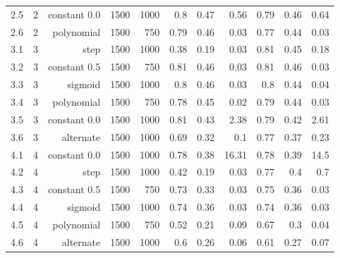 \begin{table}[]
{\begin{tabular}{rrrrrrrrrrr}
      2.5                  & 2                    & constant 0.0         & 1500           & 1000    & 0.8   & 0.47 & 0.56  & 0.79 & 0.46 & 0.64  \\
      2.6                  & 2                    & polynomial           & 1500           & 750     & 0.79  & 0.46 & 0.03  & 0.77 & 0.44 & 0.03  \\
      \hline
      3.1                  & 3                    & step                 & 1500           & 1000    & 0.38  & 0.19 & 0.03  & 0.81 & 0.45 & 0.18  \\
      3.2                  & 3                    & constant 0.5         & 1500           & 750     & 0.81  & 0.46 & 0.03  & 0.81 & 0.46 & 0.03  \\
      3.3                  & 3                    & sigmoid              & 1500           & 1000    & 0.8   & 0.46 & 0.03  & 0.8  & 0.44 & 0.04  \\
      3.4                  & 3                    & polynomial           & 1500           & 750     & 0.78  & 0.45 & 0.02  & 0.79 & 0.44 & 0.03  \\
      3.5                  & 3                    & constant 0.0         & 1500           & 1000    & 0.81  & 0.43 & 2.38  & 0.79 & 0.42 & 2.61  \\
      3.6                  & 3                    & alternate            & 1500           & 1000    & 0.69  & 0.32 & 0.1   & 0.77 & 0.37 & 0.23  \\
      \hline
      4.1                  & 4                    & constant 0.0         & 1500           & 1000    & 0.78  & 0.38 & 16.31 & 0.78 & 0.39 & 14.5  \\
      4.2                  & 4                    & step                 & 1500           & 1000    & 0.42  & 0.19 & 0.03  & 0.77 & 0.4  & 0.7   \\
      4.3                  & 4                    & constant 0.5         & 1500           & 750     & 0.73  & 0.33 & 0.03  & 0.75 & 0.36 & 0.03  \\
      4.4                  & 4                    & sigmoid              & 1500           & 1000    & 0.74  & 0.36 & 0.03  & 0.74 & 0.36 & 0.03  \\
      4.5                  & 4                    & polynomial           & 1500           & 750     & 0.52  & 0.21 & 0.09  & 0.67 & 0.3  & 0.04  \\
      4.6                  & 4                    & alternate            & 1500           & 1000    & 0.6   & 0.26 & 0.06  & 0.61 & 0.27 & 0.07  \\

\end{tabular}}
\end{table}
